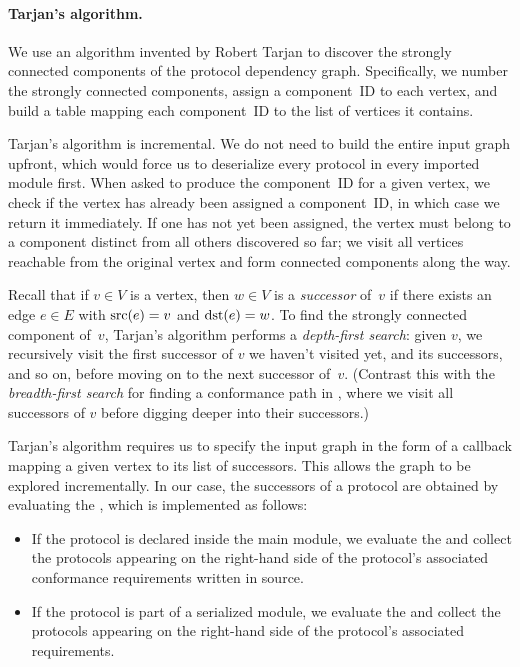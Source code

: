 \documentclass[../generics]{subfiles}
\begin{document}
\paragraph{Tarjan's algorithm.} We use an algorithm invented by Robert Tarjan \cite{tarjan} to discover the strongly connected components of the protocol dependency graph. Specifically, we number the strongly connected components, assign a component~ID to each vertex, and build a table mapping each component~ID to the list of vertices it contains.

Tarjan's algorithm is incremental. We do not need to build the entire input graph upfront, which would force us to deserialize every protocol in every imported module first. When asked to produce the component~ID for a given vertex, we check if the vertex has already been assigned a component~ID, in which case we return it immediately. If one has not yet been assigned, the vertex must belong to a component distinct from all others discovered so far; we visit all vertices reachable from the original vertex and form connected components along the way.

Recall that if $v\in V$ is a vertex, then $w\in V$ is a \emph{successor} of~$v$ if there exists an edge $e\in E$ with $\operatorname{src}(e)=v$ and $\operatorname{dst}(e)=w$. To find the strongly connected component of~$v$, Tarjan's algorithm performs a \emph{depth-first search}: given $v$, we recursively visit the first successor of $v$ we haven't visited yet, and its successors, and so on, before moving on to the next successor of~$v$. (Contrast this with the \emph{breadth-first search} for finding a conformance path in , where we visit all successors of $v$ before digging deeper into their successors.)

Tarjan's algorithm requires us to specify the input graph in the form of a callback mapping a given vertex to its list of successors. This allows the graph to be explored incrementally. In our case, the successors of a protocol are obtained by evaluating the , which is implemented as follows:
\begin{itemize}
\item If the protocol is declared inside the main module, we evaluate the  and collect the protocols appearing on the right-hand side of the protocol's associated conformance requirements written in source.

\item If the protocol is part of a serialized module, we evaluate the  and collect the protocols appearing on the right-hand side of the protocol's associated requirements.
\end{itemize}
\end{document}
